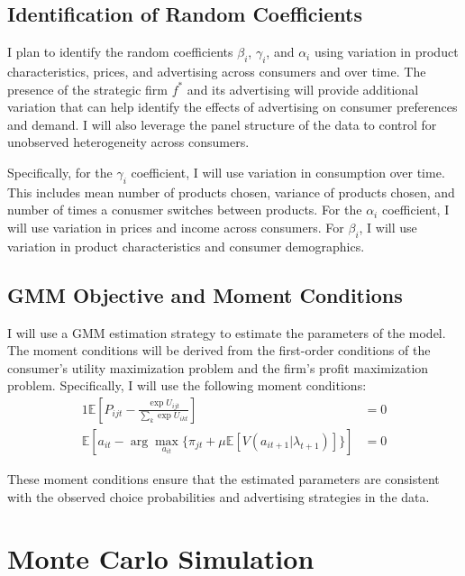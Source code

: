 \documentclass[12pt]{article}
\begin{document}
    \subsection{Identification of Random Coefficients}

    I plan to identify the random coefficients $\beta_i$, $\gamma_i$, and $\alpha_i$ using variation in product characteristics, prices, and advertising across consumers and over time. The presence of the strategic firm $f^*$ and its advertising will provide additional variation that can help identify the effects of advertising on consumer preferences and demand. I will also leverage the panel structure of the data to control for unobserved heterogeneity across consumers.

    Specifically, for the $\gamma_i$ coefficient, I will use variation in consumption over time. This includes mean number of products chosen, variance of products chosen, and number of times a conusmer switches between products. For the $\alpha_i$ coefficient, I will use variation in prices and income across consumers. For $\beta_i$, I will use variation in product characteristics and consumer demographics. 

    \subsection{GMM Objective and Moment Conditions}

      I will use a GMM estimation strategy to estimate the parameters of the model. The moment conditions will be derived from the first-order conditions of the consumer's utility maximization problem and the firm's profit maximization problem. Specifically, I will use the following moment conditions:
      \begin{alignat*}{1}
        \mathbb{E}[P_{ijt} - \frac{\exp{U_{ijt}}}{\sum_k\exp{U_{ikt}}}] &= 0 \\
        \mathbb{E}[a_{it} - \arg\max_{a_{it}} \{\pi_{jt} + \mu \mathbb{E}[V(a_{it+1} | \lambda_{t+1})]\}] &= 0
      \end{alignat*}

        These moment conditions ensure that the estimated parameters are consistent with the observed choice probabilities and advertising strategies in the data.

\section{Monte Carlo Simulation}
\end{document}
